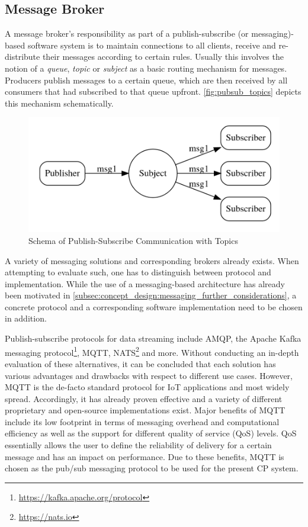 \subsection{Message Broker}
\label{subsec:implementation:message_broker}
A message broker's responsibility as part of a publish-subscribe (or messaging)-based software system is to maintain connections to all clients, receive and re-distribute their messages according to certain rules. Usually this involves the notion of a \textit{queue}, \textit{topic} or \textit{subject} as a basic routing mechanism for messages. Producers publish messages to a certain queue, which are then received by all consumers that had subscribed to that queue upfront. \autoref{fig:pubsub_topics} depicts this mechanism schematically. 

\begin{figure}
	\centering
	\includegraphics[width=0.7\linewidth]{98_images/pubsub}
	\caption[Schema of Publish-Subscribe Communication with Topics]{Schema of Publish-Subscribe Communication with Topics \cite{Collison2019}}
	\label{fig:pubsub_topics}
\end{figure}


A variety of messaging solutions and corresponding brokers already exists. When attempting to evaluate such, one has to distinguish between protocol and implementation. While the use of a messaging-based architecture has already been motivated in \autoref{subsec:concept_design:messaging_further_considerations}, a concrete protocol and a corresponding software implementation need to be chosen in addition. 

Publish-subscribe protocols for data streaming include AMQP, the Apache Kafka messaging protocol\footnote{\url{https://kafka.apache.org/protocol}}, MQTT, NATS\footnote{\url{https://nats.io}} and more. Without conducting an in-depth evaluation of these alternatives, it can be concluded that each solution has various advantages and drawbacks with respect to different use cases. However, MQTT is the de-facto standard protocol for IoT applications and most widely spread. Accordingly, it has already proven effective and a variety of different proprietary and open-source implementations exist. Major benefits of MQTT include its low footprint in terms of messaging overhead and computational efficiency as well as the support for different quality of service (QoS) levels. QoS essentially allows the user to define the reliability of delivery for a certain message and has an impact on performance. Due to these benefits, MQTT is chosen as the pub/sub messaging protocol to be used for the present CP system. 

